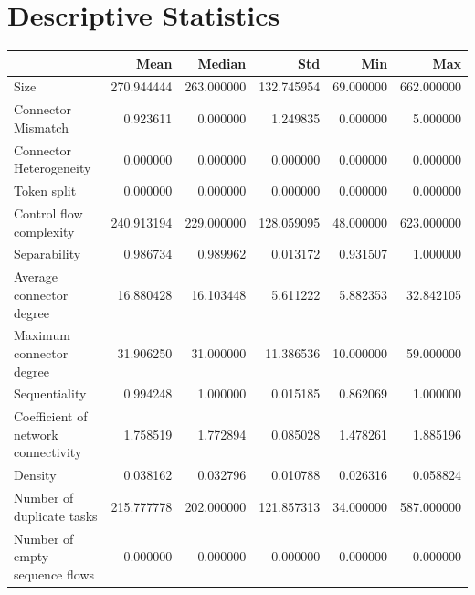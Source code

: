 \documentclass[a4paper]{article}
\begin{document}
\section*{Descriptive Statistics}
\begin{center}
\begin{tabular}{lrrrrr}
\toprule
 & Mean & Median & Std & Min & Max \\
\midrule
Size & 270.944444 & 263.000000 & 132.745954 & 69.000000 & 662.000000 \\
Connector Mismatch & 0.923611 & 0.000000 & 1.249835 & 0.000000 & 5.000000 \\
Connector Heterogeneity & 0.000000 & 0.000000 & 0.000000 & 0.000000 & 0.000000 \\
Token split & 0.000000 & 0.000000 & 0.000000 & 0.000000 & 0.000000 \\
Control flow complexity & 240.913194 & 229.000000 & 128.059095 & 48.000000 & 623.000000 \\
Separability & 0.986734 & 0.989962 & 0.013172 & 0.931507 & 1.000000 \\
Average connector degree & 16.880428 & 16.103448 & 5.611222 & 5.882353 & 32.842105 \\
Maximum connector degree & 31.906250 & 31.000000 & 11.386536 & 10.000000 & 59.000000 \\
Sequentiality & 0.994248 & 1.000000 & 0.015185 & 0.862069 & 1.000000 \\
Coefficient of network connectivity & 1.758519 & 1.772894 & 0.085028 & 1.478261 & 1.885196 \\
Density & 0.038162 & 0.032796 & 0.010788 & 0.026316 & 0.058824 \\
Number of duplicate tasks & 215.777778 & 202.000000 & 121.857313 & 34.000000 & 587.000000 \\
Number of empty sequence flows & 0.000000 & 0.000000 & 0.000000 & 0.000000 & 0.000000 \\
\bottomrule
\end{tabular}
\end{center}
\end{document}
